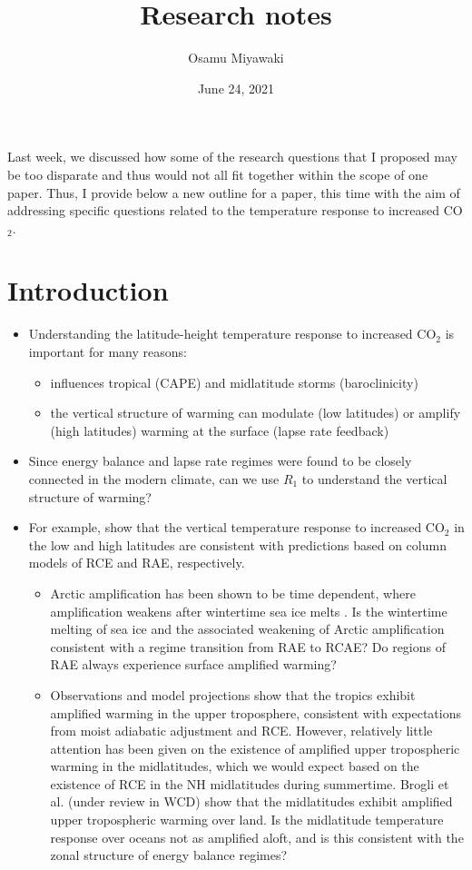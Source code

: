 \documentclass{article}
\title{Research notes}
\date{June 24, 2021}
\author{Osamu Miyawaki}
\begin{document}
\maketitle

Last week, we discussed how some of the research questions that I proposed may be too disparate and thus would not all fit together within the scope of one paper. Thus, I provide below a new outline for a paper, this time with the aim of addressing specific questions related to the temperature response to increased CO$_2$.

\section{Introduction}
\begin{itemize}
	\item Understanding the latitude-height temperature response to increased CO$_2$ is important for many reasons:
	\begin{itemize}
		\item influences tropical (CAPE) and midlatitude storms (baroclinicity)
		\item the vertical structure of warming can modulate (low latitudes) or amplify (high latitudes) warming at the surface (lapse rate feedback)
	\end{itemize}
	\item Since energy balance and lapse rate regimes were found to be closely connected in the modern climate, can we use $R_1$ to understand the vertical structure of warming?
	\item For example, \cite{payne2015} show that the vertical temperature response to increased CO$_2$ in the low and high latitudes are consistent with predictions based on column models of RCE and RAE, respectively.
	\begin{itemize}
		\item Arctic amplification has been shown to be time dependent, where amplification weakens after wintertime sea ice melts \citep{dai2019}. Is the wintertime melting of sea ice and the associated weakening of Arctic amplification consistent with a regime transition from RAE to RCAE? Do regions of RAE always experience surface amplified warming? 
		\item Observations and model projections show that the tropics exhibit amplified warming in the upper troposphere, consistent with expectations from moist adiabatic adjustment and RCE. However, relatively little attention has been given on the existence of amplified upper tropospheric warming in the midlatitudes, which we would expect based on the existence of RCE in the NH midlatitudes during summertime. Brogli et al. (under review in WCD) show that the midlatitudes exhibit amplified upper tropospheric warming over land. Is the midlatitude temperature response over oceans not as amplified aloft, and is this consistent with the zonal structure of energy balance regimes?
	\end{itemize}
\end{itemize}
\end{document}
